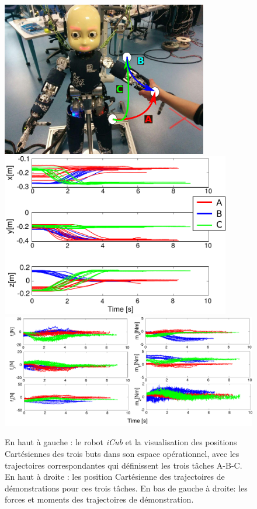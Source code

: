 \documentclass[utf8]{frontiersSCNS} %
\begin{document}
\begin{figure}[h]
\centering
\includegraphics[width=9cm]{img/experimentRepresentation.pdf}\includegraphics[width=10cm]{img/realTrajectories2.pdf}\\
\includegraphics[width=18cm]{img/realTrajectoriesv2.pdf}
\caption{En haut à gauche : le robot \textit{iCub} et la visualisation des positions Cartésiennes des trois buts dans son espace opérationnel, avec les trajectoires correspondantes qui définissent les trois tâches A-B-C. En haut à droite : les position Cartésienne des trajectoires de démonstrations pour ces trois tâches. En bas de gauche à droite: les forces et moments des trajectoires de démonstration.
}
\label{fig:realAppli}
\end{figure}
\end{document}

